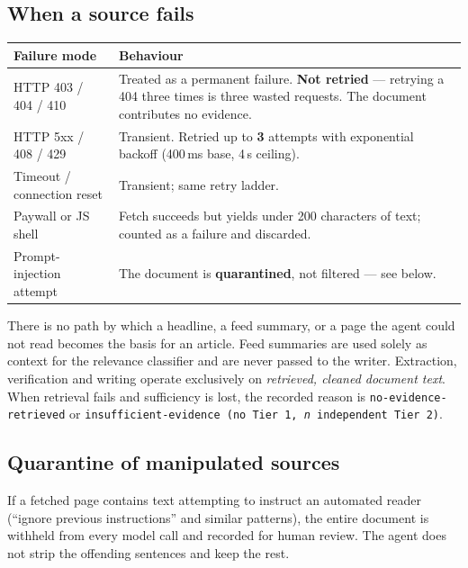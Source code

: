 \documentclass[11pt,a4paper]{article}
\newcommand{\brk}{\hyphenpenalty=0\exhyphenpenalty=0\relax}
\newcommand{\code}[1]{\texttt{\small\brk #1}}
\begin{document}
\subsection{When a source fails}

\begin{center}
\small
\begin{tabularx}{\textwidth}{@{}p{4.2cm} >{\RaggedRight}X@{}}
\toprule
\textbf{Failure mode} & \textbf{Behaviour} \\
\midrule
HTTP 403 / 404 / 410 & Treated as a permanent failure. \textbf{Not retried} ---
  retrying a 404 three times is three wasted requests. The document contributes
  no evidence. \\
HTTP 5xx / 408 / 429 & Transient. Retried up to \textbf{3} attempts with
  exponential backoff (400\,ms base, 4\,s ceiling). \\
Timeout / connection reset & Transient; same retry ladder. \\
Paywall or JS shell & Fetch succeeds but yields under 200 characters of text;
  counted as a failure and discarded. \\
Prompt-injection attempt & The document is \textbf{quarantined}, not filtered ---
  see below. \\
\bottomrule
\end{tabularx}
\end{center}

\begin{blockbox}
There is no path by which a headline, a feed summary, or a page the agent could
not read becomes the basis for an article. Feed summaries are used solely as
context for the relevance classifier and are never passed to the writer.
Extraction, verification and writing operate exclusively on \emph{retrieved,
cleaned document text}. When retrieval fails and sufficiency is lost, the
recorded reason is \code{no-evidence-retrieved} or
\code{insufficient-evidence (no Tier 1, \textit{n} independent Tier 2)}.
\end{blockbox}

\subsection{Quarantine of manipulated sources}

If a fetched page contains text attempting to instruct an automated reader
(``ignore previous instructions'' and similar patterns), the entire document is
withheld from every model call and recorded for human review. The agent does not
strip the offending sentences and keep the rest.
\end{document}
